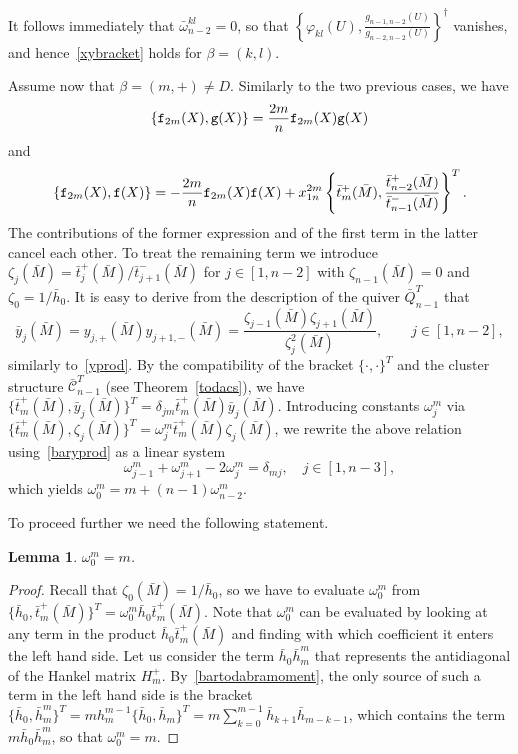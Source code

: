 \documentclass{amsart}
\newtheorem{lemma}[theorem]{Lemma}
\theoremstyle{definition}
\theoremstyle{remark}
\numberwithin{equation}{section}
\numberwithin{theorem}{section}
\def\CC{{\mathcal C}}
\def\ef{{\tt f}}
\def\eg{{\tt g}}
\def\fy{\varphi}
\def\Poi{{\{{\cdot},{\cdot}\}}}
\begin{document}
It follows immediately that $\bar\omega_{n-2}^{kl}=0$, so that $\left\{\fy_{kl}(U),\frac{g_{n-1,n-2}(U)}{g_{n-2,n-2}(U)}\right\}^\dag$ vanishes, and hence~\eqref{xybracket} holds for $\beta=(k,l)$.

Assume now that $\beta=(m,+)\ne D$. Similarly to the two previous cases, we have
\[
\{\ef_{2m}(X),\eg(X)\}=\frac {2m}n \ef_{2m}(X)\eg(X)
\]
and
\[
\{\ef_{2m}(X),\ef(X)\}=-\frac {2m}n \ef_{2m}(X)\ef(X)+x_{1n}^{2m}\left\{\bar t_m^+(\bar M),\frac{\bar t^+_{n-2}(\bar M)}
{\bar t^-_{n-1}(\bar M)}\right\}^T.
\]
The contributions of the former expression and of the first term in the latter cancel each other. To treat the remaining term we introduce $\zeta_j(\bar M)=\bar t_j^+(\bar M)/\bar t_{j+1}^-(\bar M)$ for $j\in[1,n-2]$ with
$\zeta_{n-1}(\bar M)=0$ 
and $\zeta_0=1/\bar h_0$. It is easy to derive from the description of the quiver $\bar Q_{n-1}^T$ that
\begin{equation}\label{baryprod}
\bar y_j(\bar M)=y_{j,+}(\bar M)y_{j+1,-}(\bar M)=\frac{\zeta_{j-1}(\bar M)\zeta_{j+1}(\bar M)}{\zeta_j^2(\bar M)}, \qquad j\in[1,n-2],
\end{equation}
similarly to~\eqref{yprod}. By the compatibility of the bracket $\Poi^T$ and the cluster structure $\bar\CC_{n-1}^T$ (see 
Theorem~\ref{todacs}), we have $\{\bar t_m^+(\bar M),\bar y_j(\bar M)\}^T=\delta_{jm}\bar t_m^+(\bar M)\bar y_j(\bar M)$.
Introducing constants $\omega_j^{m}$ via $\{\bar t_m^+(\bar M),\zeta_j(\bar M)\}^T=\omega_j^{m}\bar t_m^+(\bar M)\zeta_j(\bar M)$, we rewrite the above relation using~\eqref{baryprod} as a linear system
\[
\omega_{j-1}^{m}+\omega_{j+1}^{m}-2\omega_j^{m}=\delta_{mj},\quad j\in[1,n-3],
\]
which yields $\omega_0^{m}=m+(n-1)\omega_{n-2}^{m}$. 

To proceed further we need the following statement.

\begin{lemma}\label{omega0}
$\omega_0^m=m$.
\end{lemma}

\begin{proof} Recall that $\zeta_0(\bar M)=1/\bar h_0$, so we have to evaluate $\omega_0^m$ from 
$\{\bar h_0,\bar t_m^+(\bar M)\}^T=\omega_0^m\bar h_0\bar t_m^+(\bar M)$. Note that $\omega_0^m$ can be evaluated by looking at any term in the product $\bar h_0\bar t_m^+(\bar M)$ and finding with which coefficient it enters the left hand side. Let us consider the term $\bar h_0\bar h_m^m$ that represents the antidiagonal of the Hankel matrix $H_m^+$. By~\eqref{bartodabramoment}, the only source of such a term in the left hand side is the bracket 
$\{\bar h_0,\bar h_m^m\}^T=mh_m^{m-1}\{\bar h_0,\bar h_m\}^T=m\sum_{k=0}^{m-1}\bar h_{k+1}\bar h_{m-k-1}$, which
contains the term $m\bar h_0\bar h_m^m$, so that $\omega_0^m=m$.
\end{proof}
\end{document}
